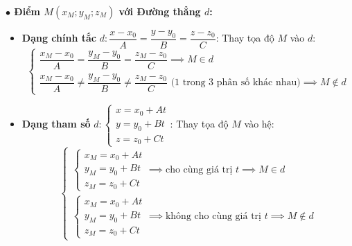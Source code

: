 \documentclass[12pt,a4paper]{article}
\begin{document}
\begin{theorybox}
    \textbf{\textcolor{amberorange}{$\bullet$ Điểm $M(x_M; y_M; z_M)$ với Đường thẳng $d$:}}
    \begin{itemize}
        \item \textbf{Dạng chính tắc } $d\colon \dfrac{x - x_0}{A} = \dfrac{y - y_0}{B} = \dfrac{z - z_0}{C}$: Thay tọa độ $M$ vào $d$:
        \[
            \begin{cases}
                \dfrac{x_M - x_0}{A} = \dfrac{y_M - y_0}{B} = \dfrac{z_M - z_0}{C} \implies M \in d \\[8pt]
                \dfrac{x_M - x_0}{A} \neq \dfrac{y_M - y_0}{B} \neq \dfrac{z_M - z_0}{C} \text{ (1 trong 3 phân số khác nhau)} \implies M \notin d
            \end{cases}
        \]
        \item \textbf{Dạng tham số } $d\colon \begin{cases} x = x_0 + At \\ y = y_0 + Bt \\ z = z_0 + Ct \end{cases}$: Thay tọa độ $M$ vào hệ:
        \[
            \begin{cases}
                \begin{cases} x_M = x_0 + At \\ y_M = y_0 + Bt \\ z_M = z_0 + Ct \end{cases} \implies \text{cho cùng giá trị } t \implies M \in d \\[14pt]
                \begin{cases} x_M = x_0 + At \\ y_M = y_0 + Bt \\ z_M = z_0 + Ct \end{cases} \implies \text{không cho cùng giá trị } t \implies M \notin d
            \end{cases}
        \]
    \end{itemize}
\end{theorybox}

\newpage
\end{document}
